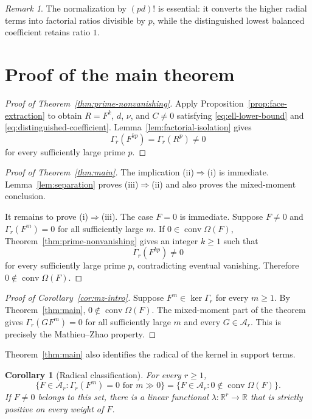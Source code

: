 \documentclass[11pt]{article}
\numberwithin{equation}{section}
\newtheorem{corollary}[theorem]{Corollary}
\theoremstyle{definition}
\theoremstyle{remark}
\newtheorem{remark}[theorem]{Remark}
\newcommand{\R}{\mathbb R}
\newcommand{\A}{\mathcal A}
\newcommand{\conv}{\operatorname{conv}}
\begin{document}
\begin{remark}
The normalization by $(pd)!$ is essential: it converts the higher radial
terms into factorial ratios divisible by $p$, while the distinguished lowest
balanced coefficient retains ratio $1$.
\end{remark}

\section{Proof of the main theorem}

\begin{proof}[Proof of Theorem~\ref{thm:prime-nonvanishing}]
Apply Proposition~\ref{prop:face-extraction} to obtain
$R=F^k$, $d$, $\nu$, and $C\ne0$ satisfying
\eqref{eq:ell-lower-bound} and \eqref{eq:distinguished-coefficient}.
Lemma~\ref{lem:factorial-isolation} gives
\[
  \Gamma_r(F^{kp})=\Gamma_r(R^p)\ne0
\]
for every sufficiently large prime $p$.
\end{proof}

\begin{proof}[Proof of Theorem~\ref{thm:main}]
The implication \textup{(ii)}$\Rightarrow$\textup{(i)} is immediate.
Lemma~\ref{lem:separation} proves
\textup{(iii)}$\Rightarrow$\textup{(ii)} and also proves the mixed-moment
conclusion.

It remains to prove \textup{(i)}$\Rightarrow$\textup{(iii)}.  The case
$F=0$ is immediate.  Suppose $F\ne0$ and
$\Gamma_r(F^m)=0$ for all sufficiently large $m$.  If
$0\in\conv\Omega(F)$, Theorem~\ref{thm:prime-nonvanishing} gives an integer
$k\ge1$ such that
\[
  \Gamma_r(F^{kp})\ne0
\]
for every sufficiently large prime $p$, contradicting eventual vanishing.
Therefore $0\notin\conv\Omega(F)$.
\end{proof}

\begin{proof}[Proof of Corollary~\ref{cor:mz-intro}]
Suppose $F^m\in\ker\Gamma_r$ for every $m\ge1$.  By
Theorem~\ref{thm:main}, $0\notin\conv\Omega(F)$.  The mixed-moment part of
the theorem gives $\Gamma_r(GF^m)=0$ for all sufficiently large $m$ and
every $G\in\A_r$.  This is precisely the Mathieu--Zhao property.
\end{proof}

Theorem~\ref{thm:main} also identifies the radical of the kernel in support
terms.

\begin{corollary}[Radical classification]\label{cor:radical}
For every $r\ge1$,
\[
  \{F\in\A_r:\Gamma_r(F^m)=0\text{ for }m\gg0\}
  =\{F\in\A_r:0\notin\conv\Omega(F)\}.
\]
If $F\ne0$ belongs to this set, there is a linear functional
$\lambda:\R^r\to\R$ that is strictly positive on every weight of $F$.
\end{corollary}
\end{document}
